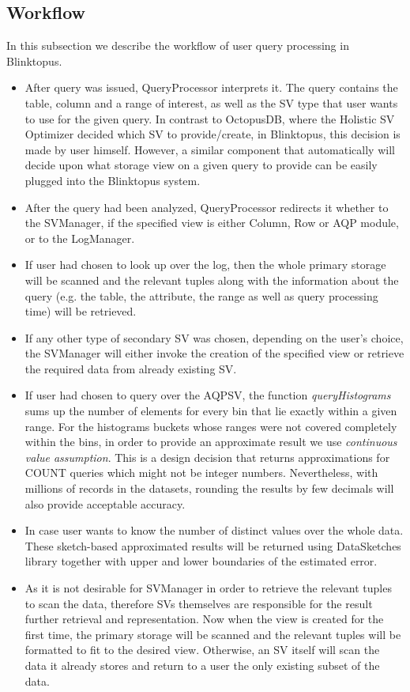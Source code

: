 \documentclass[10pt, conference, compsocconf]{IEEEtran}
\begin{document}
\subsection{Workflow}

In this subsection we describe the workflow of user query processing in Blinktopus.
\begin{itemize}
\item{After query was issued, QueryProcessor interprets it. The query contains the table, column and a range of interest, as well as the SV type that user wants to use for the given query. In contrast to OctopusDB, where the Holistic SV Optimizer decided which SV to provide/create, in Blinktopus, this decision is made by user himself. However, a similar component that automatically will decide upon what storage view on a given query to provide can be easily plugged into the Blinktopus system.}
\item{After the query had been analyzed, QueryProcessor redirects it whether to the SVManager, if the specified view is either Column, Row or AQP module, or to the LogManager.}
\item{If user had chosen to look up over the log, then the whole primary storage will be scanned and the relevant tuples along with the information about the query (e.g. the table, the attribute, the range as well as query processing time) will be retrieved.}
\item{If any other type of secondary SV was chosen, depending on the user's choice, the SVManager will either invoke the creation of the specified view or retrieve the required data from already existing SV.}
\item{If user had chosen to query over the AQPSV, the function \textit{queryHistograms} sums up the number of elements for every bin that lie exactly within a given range. For the histograms buckets whose ranges were not covered completely within the bins, in order to provide an approximate result we use \textit{continuous value assumption}. This is a design decision that returns approximations for COUNT queries which might not be integer numbers. Nevertheless, with millions of records in the datasets, rounding the results by few decimals will also provide acceptable accuracy.}
\item{In case user wants to know the number of distinct values over the whole data. These sketch-based approximated results will be returned using DataSketches library together with upper and lower boundaries of the estimated error.}
\item{As it is not desirable for SVManager in order to retrieve the relevant tuples to scan the data, therefore SVs themselves are responsible for the result further retrieval and representation. Now when the view is created for the first time, the primary storage will be scanned and the relevant tuples will be formatted to fit to the desired view. Otherwise, an SV itself will scan the data it already stores and return to a user the only existing subset of the data.}
\end{itemize}
\end{document}
